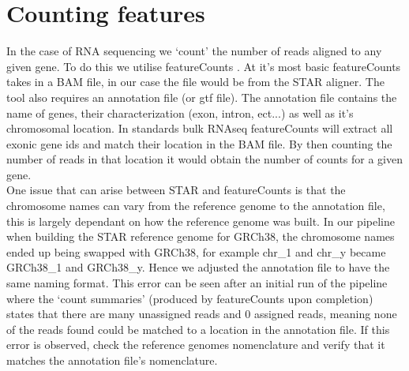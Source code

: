 \section{Counting features \label{sec:featureCounts}}
In the case of RNA sequencing we `count' the number of reads aligned to any given gene. To do this we utilise featureCounts \cite{liao2014featurecounts}. At it's most basic featureCounts takes in a BAM file, in our case the file would be from the STAR aligner. The tool also requires an annotation file (or gtf file). The annotation file contains the name of genes, their characterization (exon, intron, ect...) as well as it's chromosomal location. In standards bulk RNAseq featureCounts will extract all exonic gene ids and match their location in the BAM file. By then counting the number of reads in that location it would obtain the number of counts for a given gene.\\
One issue that can arise between STAR and featureCounts is that the chromosome names can vary from the reference genome to the annotation file, this is largely dependant on how the reference genome was built. In our pipeline when building the STAR reference genome for GRCh38, the chromosome names ended up being swapped with GRCh38, for example chr\_1 and chr\_y became GRCh38\_1 and GRCh38\_y. Hence we adjusted the annotation file to have the same naming format. This error can be seen after an initial run of the pipeline where the `count summaries' (produced by featureCounts upon completion) states that there are many unassigned reads and 0 assigned reads, meaning none of the reads found could be matched to a location in the annotation file. If this error is observed, check the reference genomes nomenclature and verify that it matches the annotation file's nomenclature.